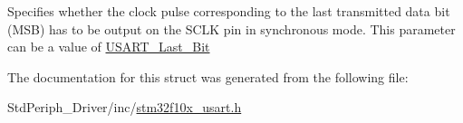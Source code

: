 Specifies whether the clock pulse corresponding to the last transmitted data bit (M\+SB) has to be output on the S\+C\+LK pin in synchronous mode. This parameter can be a value of \mbox{\hyperlink{group___u_s_a_r_t___last___bit}{U\+S\+A\+R\+T\+\_\+\+Last\+\_\+\+Bit}} 

The documentation for this struct was generated from the following file\+:\begin{DoxyCompactItemize}
\item 
Std\+Periph\+\_\+\+Driver/inc/\mbox{\hyperlink{stm32f10x__usart_8h}{stm32f10x\+\_\+usart.\+h}}\end{DoxyCompactItemize}
